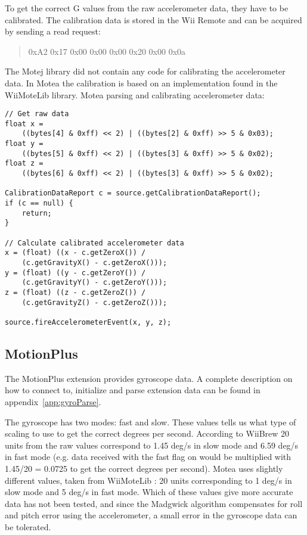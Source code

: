 To get the correct G values from the raw accelerometer data, they have to be calibrated. The calibration data is stored in the Wii Remote and can be acquired by sending a read request:
\begin{quote}
0xA2 0x17 0x00 0x00 0x00 0x20 0x00 0x0a
\end{quote}

The Motej \cite{Motej} library did not contain any code for calibrating the accelerometer data. In Motea the calibration is based on an implementation found in the WiiMoteLib \cite{wiiMoteLib} library. Motea parsing and calibrating accelerometer data:
\begin{lstlisting}
// Get raw data
float x = 
	((bytes[4] & 0xff) << 2) | ((bytes[2] & 0xff) >> 5 & 0x03);
float y = 
	((bytes[5] & 0xff) << 2) | ((bytes[3] & 0xff) >> 5 & 0x02);
float z = 
	((bytes[6] & 0xff) << 2) | ((bytes[3] & 0xff) >> 5 & 0x02);

CalibrationDataReport c = source.getCalibrationDataReport();
if (c == null) {
	return;
}

// Calculate calibrated accelerometer data
x = (float) ((x - c.getZeroX()) / 
	(c.getGravityX() - c.getZeroX()));
y = (float) ((y - c.getZeroY()) / 
	(c.getGravityY() - c.getZeroY()));
z = (float) ((z - c.getZeroZ())	/ 
	(c.getGravityZ() - c.getZeroZ()));

source.fireAccelerometerEvent(x, y, z);
\end{lstlisting}

\subsection{MotionPlus}
The MotionPlus extension provides gyroscope data. A complete description on how to connect to, initialize and parse extension data can be found in appendix~\ref{app:gyroParse}.

The gyroscope has two modes: fast and slow. These values tells us what type of scaling to use to get the correct degrees per second. According to WiiBrew \cite{wiiBrew} 20 units from the raw values correspond to 1.45 deg/s in slow mode and 6.59 deg/s in fast mode (e.g. data received with the fast flag on would be multiplied with 1.45/20 = 0.0725 to get the correct degrees per second). Motea uses slightly different values, taken from WiiMoteLib \cite{wiiMoteLib}: 20 units corresponding to 1 deg/s in slow mode and 5 deg/s in fast mode. Which of these values give more accurate data has not been tested, and since the Madgwick algorithm \cite{madgwick} compensates for roll and pitch error using the accelerometer, a small error in the gyroscope data can be tolerated.


